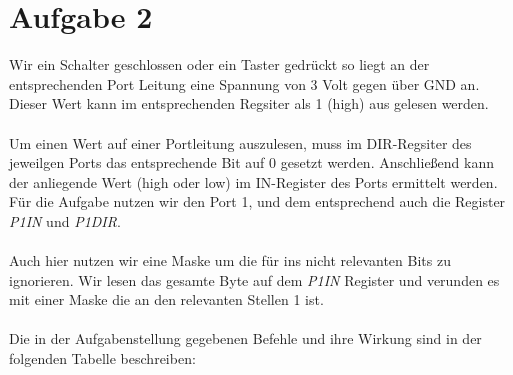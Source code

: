 


\section*{Aufgabe 2}

Wir ein Schalter geschlossen oder ein Taster gedrückt so liegt an der entsprechenden Port Leitung eine Spannung von 3 Volt gegen über GND an. Dieser Wert kann im entsprechenden Regsiter als 1 (high) aus gelesen werden.
\paragraph*{}
Um einen Wert auf einer Portleitung auszulesen, muss im DIR-Regsiter des jeweilgen Ports das entsprechende Bit auf 0 gesetzt werden. Anschließend kann der anliegende Wert (high oder low) im IN-Register des Ports ermittelt werden. Für die Aufgabe nutzen wir den Port 1, und dem entsprechend auch die Register {\em P1IN} und {\em P1DIR}.
\paragraph{}
Auch hier nutzen wir eine Maske um die für ins nicht relevanten Bits zu ignorieren. Wir lesen das gesamte Byte auf dem {\em P1IN} Register und verunden es mit einer Maske die an den relevanten Stellen 1 ist.
\paragraph{} Die in der Aufgabenstellung gegebenen Befehle und 
ihre Wirkung sind in der folgenden Tabelle beschreiben:

